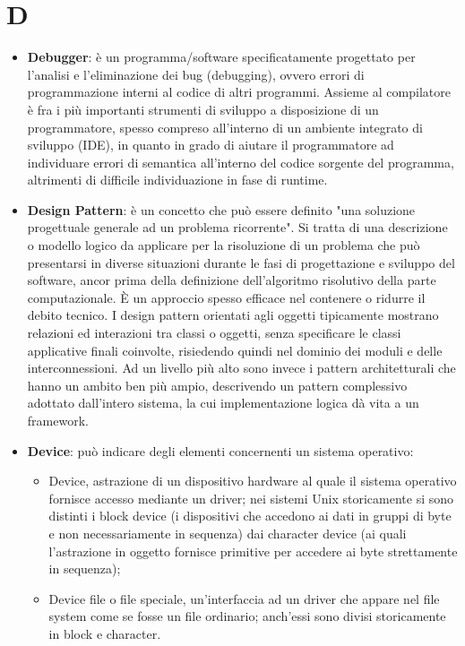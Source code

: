 \section{D}
\begin{itemize} 
	\item
	\textbf{Debugger}: è un programma/software specificatamente progettato per l'analisi e l'eliminazione dei bug (debugging), ovvero errori di programmazione interni al codice di altri programmi. Assieme al compilatore è fra i più importanti strumenti di sviluppo a disposizione di un programmatore, spesso compreso all'interno di un ambiente integrato di sviluppo (IDE), in quanto in grado di aiutare il programmatore ad individuare errori di semantica all'interno del codice sorgente del programma, altrimenti di difficile individuazione in fase di runtime.
	\item
	\textbf{Design Pattern}: è un concetto che può essere definito "una soluzione progettuale generale ad un problema ricorrente". Si tratta di una descrizione o modello logico da applicare per la risoluzione di un problema che può presentarsi in diverse situazioni durante le fasi di progettazione e sviluppo del software, ancor prima della definizione dell'algoritmo risolutivo della parte computazionale. È un approccio spesso efficace nel contenere o ridurre il debito tecnico.
I design pattern orientati agli oggetti tipicamente mostrano relazioni ed interazioni tra classi o oggetti, senza specificare le classi applicative finali coinvolte, risiedendo quindi nel dominio dei moduli e delle interconnessioni. Ad un livello più alto sono invece i pattern architetturali che hanno un ambito ben più ampio, descrivendo un pattern complessivo adottato dall'intero sistema, la cui implementazione logica dà vita a un framework.
	\item
	\textbf{Device}: può indicare degli elementi concernenti un sistema operativo:
	 \begin{itemize} 
	\item
    Device, astrazione di un dispositivo hardware al quale il sistema operativo fornisce accesso mediante un driver; nei sistemi Unix storicamente si sono distinti i block device (i dispositivi che accedono ai dati in gruppi di byte e non necessariamente in sequenza) dai character device (ai quali l'astrazione in oggetto fornisce primitive per accedere ai byte strettamente in sequenza);
 	\item  
    Device file o file speciale, un'interfaccia ad un driver che appare nel file system come se fosse un file ordinario; anch'essi sono divisi storicamente in block e character.

\end{itemize}
\end{itemize}
